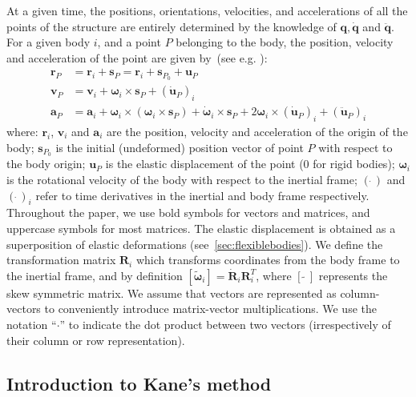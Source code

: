 \documentclass[wes, manuscript]{copernicus}
\renewcommand{\v}[1]{\boldsymbol{#1}}
\newcommand{\m}[1]{\boldsymbol{#1}}
\begin{document}
At a given time, the positions, orientations, velocities, and accelerations of all the points of the structure are entirely determined by the knowledge of $\v{q},\v{\dot{q}}$ and $\v{\ddot{q}}$. 
For a given body $i$, and a point $P$ belonging to the body, the position, velocity and acceleration of the point are given by~(see e.g. \cite{shabana:book}):
\begin{align}
\v{r}_P &= \v{r}_i + \v{s}_P = \v{r}_i+\v{s}_{P_0}+\v{u}_P\\
\v{v}_P &= \v{v}_i + \v{\omega}_i\times\v{s}_{P} + (\v{\dot{u}}_P)_i\\
\v{a}_P &= \v{a}_i + \v{\omega}_i\times(\v{\omega}_i\times \v{s}_P) 
        + \v{\dot{\omega}}_i\times\v{s}_{P}
        + 2\v{\omega}_i\times (\v{\dot{u}}_P)_i
        + (\v{\ddot{u}}_P)_i
\end{align}
where: $\v{r}_i$, $\v{v}_i$ and $\v{a}_i$ are the position, velocity and acceleration of the origin of the body; $\v{s}_{P_0}$ is the initial (undeformed) position vector of point $P$ with respect to the body origin; $\v{u}_P$ is the elastic displacement of the point ($0$ for rigid bodies); $\v{\omega}_i$ is the rotational velocity of the body with respect to the inertial frame;  $(\dot{\ })$ and $(\dot{\ })_i$ refer to time derivatives in the inertial and body frame respectively. 
Throughout the paper, we use bold symbols for vectors and matrices, and uppercase symbols for most matrices.
The elastic displacement is obtained as a superposition of elastic deformations (see~\autoref{sec:flexiblebodies}).
We define the transformation matrix $\m{R}_i$ which transforms coordinates from the body frame to the inertial frame, and by definition
$[\v{\tilde{{\omega}}}_i] = \v{\dot{R}}_i\v{R}_i^T$, where $[\tilde{\ \ }]$ represents the skew symmetric matrix. 
We assume that vectors are represented as column-vectors to conveniently introduce matrix-vector multiplications.
We use the notation ``$\cdot$'' to indicate the dot product between two vectors (irrespectively of their column or row representation).






\subsection{Introduction to Kane's method}
\end{document}
